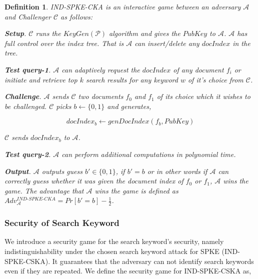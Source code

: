 \documentclass[sigconf,pdftex]{acmart}
\newtheorem{definition}{Definition}[]
\begin{document}
\begin{definition}\label{ind-spke-cka-game}
IND-SPKE-CKA is an interactive game between an adversary $\mathcal{A}$ and Challenger $\mathcal{C}$ as follows:

\textbf{\textit{Setup}}. $\mathcal{C}$ runs the $KeyGen(\mathcal{P})$ algorithm and gives the $PubKey$ to $\mathcal{A}$. $\mathcal{A}$ has full control over the index tree. That is $\mathcal{A}$ can insert/delete any $docIndex$ in the tree.

\textbf{\textit{Test query-1}}. $\mathcal{A}$ can adaptively request the $docIndex$ of any document $f_i$ or initiate and retrieve top $k$ search results for any keyword $w$ of it's choice from $\mathcal{C}$.

\textbf{\textit{Challenge}}. $\mathcal{A}$ sends $\mathcal{C}$ two documents $f_0$ and $f_1$ of its choice which it wishes to be challenged. $\mathcal{C}$ picks $b\leftarrow\{0,1\}$ and generates,

\begin{equation}
docIndex_b\leftarrow genDocIndex(f_b, PubKey)
\end{equation}

$\mathcal{C}$ sends $docIndex_b$ to $\mathcal{A}$.


\textbf{\textit{Test query-2}}. $\mathcal{A}$ can perform additional computations in polynomial time.

\textbf{\textit{Output}}. $\mathcal{A}$ outputs guess $b'\in \{0,1\}$, if $b' = b$ or in other words if $\mathcal{A}$ can correctly guess whether it was given the document index of $f_0$ or $f_1$, $\mathcal{A}$ wins the game. The advantage that $\mathcal{A}$ wins the game is defined as $Adv_{\mathcal{A}}^{\textit{IND-SPKE-CKA}}= Pr[b' = b]-\frac{1}{2}$.


\end{definition}


\subsubsection{Security of Search Keyword} 



We introduce a security game for the search keyword's security, namely indistinguishability under the chosen search keyword attack for SPKE (IND-SPKE-CSKA). It guarantees that the adversary can not identify search keywords even if they are repeated. We define the security game for IND-SPKE-CSKA as,
\end{document}

